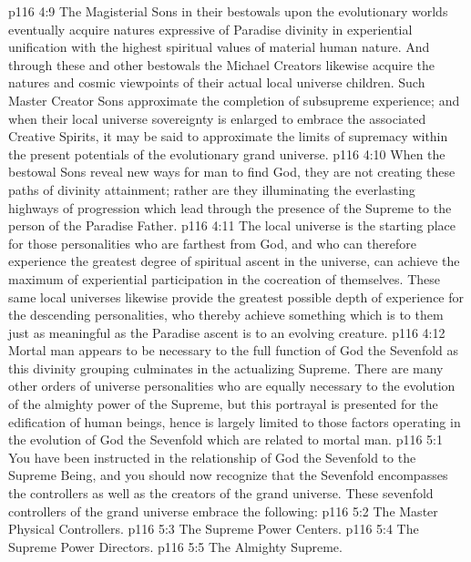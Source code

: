 \vs p116 4:9 The Magisterial Sons in their bestowals upon the evolutionary worlds eventually acquire natures expressive of Paradise divinity in experiential unification with the highest spiritual values of material human nature. And through these and other bestowals the Michael Creators likewise acquire the natures and cosmic viewpoints of their actual local universe children. Such Master Creator Sons approximate the completion of subsupreme experience; and when their local universe sovereignty is enlarged to embrace the associated Creative Spirits, it may be said to approximate the limits of supremacy within the present potentials of the evolutionary grand universe.
\vs p116 4:10 When the bestowal Sons reveal new ways for man to find God, they are not creating these paths of divinity attainment; rather are they illuminating the everlasting highways of progression which lead through the presence of the Supreme to the person of the Paradise Father.
\vs p116 4:11 The local universe is the starting place for those personalities who are farthest from God, and who can therefore experience the greatest degree of spiritual ascent in the universe, can achieve the maximum of experiential participation in the cocreation of themselves. These same local universes likewise provide the greatest possible depth of experience for the descending personalities, who thereby achieve something which is to them just as meaningful as the Paradise ascent is to an evolving creature.
\vs p116 4:12 \pc Mortal man appears to be necessary to the full function of God the Sevenfold as this divinity grouping culminates in the actualizing Supreme. There are many other orders of universe personalities who are equally necessary to the evolution of the almighty power of the Supreme, but this portrayal is presented for the edification of human beings, hence is largely limited to those factors operating in the evolution of God the Sevenfold which are related to mortal man.
\vs p116 5:1 You have been instructed in the relationship of God the Sevenfold to the Supreme Being, and you should now recognize that the Sevenfold encompasses the controllers as well as the creators of the grand universe. These sevenfold controllers of the grand universe embrace the following:
\vs p116 5:2 \bibnobreakspace The Master Physical Controllers.
\vs p116 5:3 \bibnobreakspace The Supreme Power Centers.
\vs p116 5:4 \bibnobreakspace The Supreme Power Directors.
\vs p116 5:5 \bibnobreakspace The Almighty Supreme.
